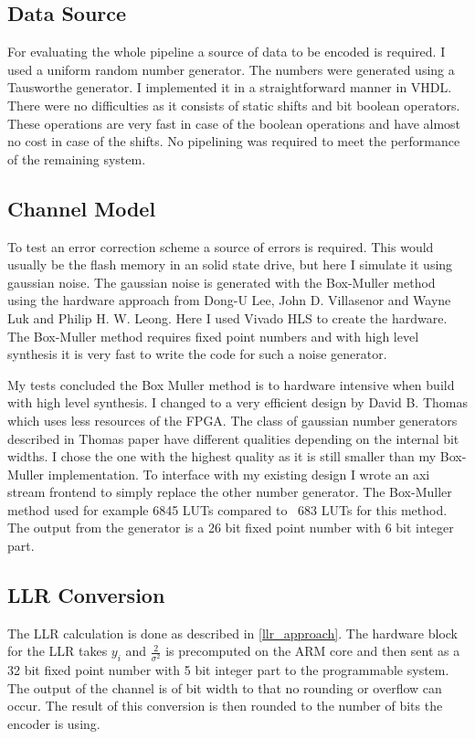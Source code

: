 \subsection{Data Source}
For evaluating the whole pipeline a source of data to be encoded is required. I used a uniform random number generator. The numbers were generated using a Tausworthe generator\cite{Ec96}. I implemented it in a straightforward manner in VHDL. There were no difficulties as it consists of static shifts and bit boolean operators. These operations are very fast in case of the boolean operations and have almost no cost in case of the shifts. No pipelining was required to meet the performance of the remaining system.

\subsection{Channel Model}
To test an error correction scheme a source of errors is required. This would usually be the flash memory in an solid state drive, but here I simulate it using gaussian noise. The gaussian noise is generated with the Box-Muller method using the hardware approach from Dong-U Lee, John D. Villasenor and Wayne Luk and Philip H. W. Leong\cite{LeVi06}. Here I used Vivado HLS to create the hardware. The Box-Muller method requires fixed point numbers and with high level synthesis it is very fast to write the code for such a noise generator.

My tests concluded the Box Muller method is to hardware intensive when build with high level synthesis. I changed to a very efficient design by David B. Thomas\cite{Th14} which uses less resources of the FPGA. The class of gaussian number generators described in Thomas paper have different qualities depending on the internal bit widths. I chose the one with the highest quality as it is still smaller than my Box-Muller implementation. To interface with my existing design I wrote an axi stream frontend to simply replace the other number generator. The Box-Muller method used for example 6845 LUTs compared to ~683 LUTs for this method. The output from the generator is a 26 bit fixed point number with 6 bit integer part.

\subsection{LLR Conversion}
The LLR calculation is done as described in \cref{llr_approach}. The hardware block for the LLR takes $y_i$ and $\frac{2}{\sigma^2}$ is precomputed on the ARM core and then sent as a 32 bit fixed point number with 5 bit integer part to the programmable system. The output of the channel is of bit width to that no rounding or overflow can occur. The result of this conversion is then rounded to the number of bits the encoder is using.

